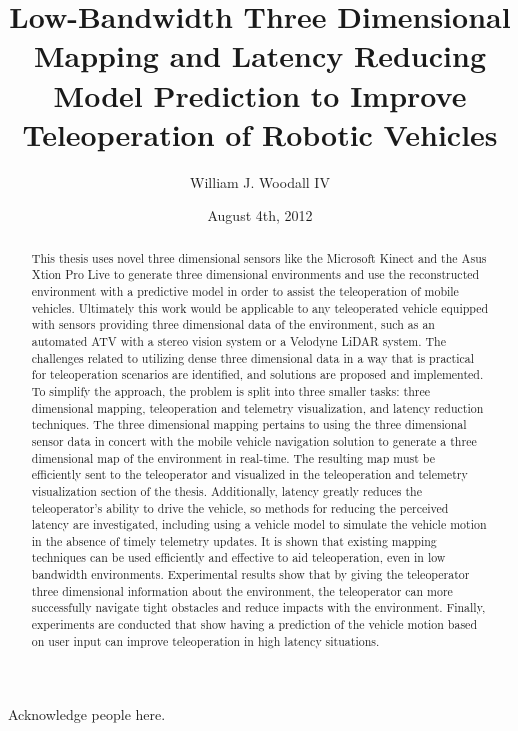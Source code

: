 \documentclass[12pt]{report}
\title{Low-Bandwidth Three Dimensional Mapping and Latency Reducing Model Prediction to Improve Teleoperation of Robotic Vehicles}
\author{William J. Woodall IV}
\date{August 4th, 2012} %
\begin{document}

\begin{romanpages}      %

\TitlePage 


\begin{abstract} 
This thesis uses novel three dimensional sensors like the Microsoft Kinect\cite{KINECT} and the Asus Xtion Pro Live\cite{ASUS} to generate three dimensional environments and use the reconstructed environment with a predictive model in order to assist the teleoperation of mobile vehicles.  Ultimately this work would be applicable to any teleoperated vehicle equipped with sensors providing three dimensional data of the environment, such as an automated ATV with a stereo vision system or a Velodyne LiDAR\cite{halterman2010velodyne} system.  The challenges related to utilizing dense three dimensional data in a way that is practical for teleoperation scenarios are identified, and solutions are proposed and implemented.  To simplify the approach, the problem is split into three smaller tasks: three dimensional mapping, teleoperation and telemetry visualization, and latency reduction techniques.  The three dimensional mapping pertains to using the three dimensional sensor data in concert with the mobile vehicle navigation solution to generate a three dimensional map of the environment in real-time.  The resulting map must be efficiently sent to the teleoperator and visualized in the teleoperation and telemetry visualization section of the thesis.  Additionally, latency greatly reduces the teleoperator's ability to drive the vehicle, so methods for reducing the perceived latency are investigated, including using a vehicle model to simulate the vehicle motion in the absence of timely telemetry updates.  It is shown that existing mapping techniques can be used efficiently and effective to aid teleoperation, even in low bandwidth environments.  Experimental results show that by giving the teleoperator three dimensional information about the environment, the teleoperator can more successfully navigate tight obstacles and reduce impacts with the environment.  Finally, experiments are conducted that show having a prediction of the vehicle motion based on user input can improve teleoperation in high latency situations.
\end{abstract}


\begin{acknowledgments}
Acknowledge people here.
\end{acknowledgments}

\tableofcontents
\listoffigures
\listoftables
\listofalgorithms

\printnomenclature[0.5in] %
\end{romanpages}        %
\end{document}
